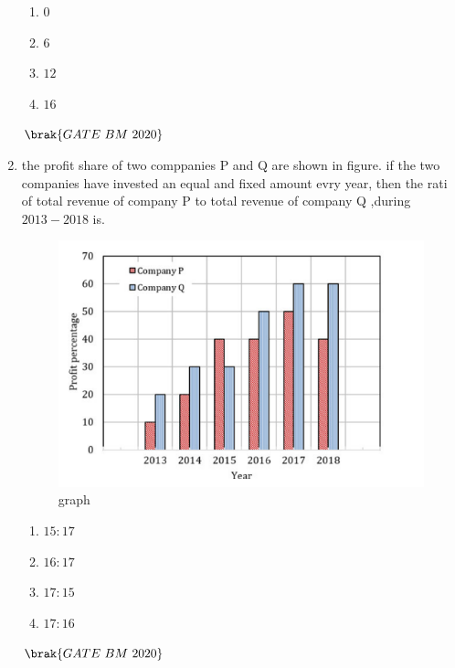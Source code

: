 \documentclass[journal,12pt,onecolumn]{IEEEtran}
\theoremstyle{remark}
\begin{document}
\begin{enumerate}
\begin{enumerate}
\item\hspace{0.5cm}$0$
\item\hspace{0.5cm}$6$
\item\hspace{0.5cm}$12$
\item\hspace{0.5cm}$16$\\
\end{enumerate}
\hfill $\brak{GATE\ BM\ 2020}$\\

\item the profit share of two comppanies P and Q are shown in figure. if the two companies have invested an equal and fixed amount evry year, then the rati of total revenue of company P to total revenue of company Q ,during $2013-2018$ is\underline{\hspace{2cm}}.
\begin{figure}[H]
\centering
\includegraphics[width=0.4\columnwidth]{Figs/fig1.png}

\caption{graph}
\label{fig:placeholder}
\end{figure}
\begin{enumerate}
\item\hspace{0.5cm}$15:17$
\item\hspace{0.5cm}$16:17$
\item\hspace{0.5cm}$17:15$
\item\hspace{0.5cm}$17:16$\\
 \end{enumerate}
 \hfill $\brak{GATE\ BM\ 2020}$\\
 \end{enumerate}
 
\end{document}
